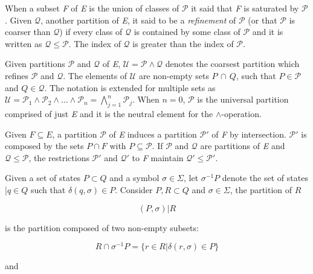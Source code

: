 {When a subset \textit{F} of \textit{E} is the union of classes of $\mathcal{P}$ it said that \textit{F} is saturated by $\mathcal{P}$. Given $\mathcal{Q}$, another partition of \textit{E}, it said to be a \textit{refinement} of $\mathcal{P}$ (or that $\mathcal{P}$ is coarser than $\mathcal{Q}$) if every class of $\mathcal{Q}$ is contained by some class of $\mathcal{P}$ and it is written as $\mathcal{Q} \leq \mathcal{P}$. The index of $\mathcal{Q}$ is greater than the index of $\mathcal{P}$.

Given partitions $\mathcal{P}$ and $\mathcal{Q}$ of \textit{E}, $\mathcal{U} = \mathcal{P}\wedge\mathcal{Q}$ denotes the coarsest partition which refines $\mathcal{P}$ and $\mathcal{Q}$. The elements of $\mathcal{U}$ are non-empty sets $P\,\cap\,Q$, such that $P \in\mathcal{P}$ and 	$Q \in\mathcal{Q}$. The notation is extended for multiple sets as $\mathcal{U} = \mathcal{P}_1 \wedge \mathcal{P}_2 \wedge \ldots \wedge \mathcal{P}_n = \bigwedge\limits_{j=1}^n\mathcal{P}_j$. When $n=0$,  $\mathcal{P}$ is the universal partition comprised of just \textit{E} and it is the neutral element for the $\wedge$-operation.

Given $F\subseteq E$, a partition $\mathcal{P}$ of \textit{E} induces a partition $\mathcal{P}'$  
of \textit{F} by intersection. $\mathcal{P}'$ is composed by the sets $P\cap F$ with $P\subseteq \mathcal{P}$. If $\mathcal{P}$ and $\mathcal{Q}$ are partitions of \textit{E} and $\mathcal{Q} \leq \mathcal{P}$, the restrictions $\mathcal{P}'$ and $\mathcal{Q}'$ to \textit{F} maintain $\mathcal{Q}' \leq \mathcal{P}'$.



Given a set of states $P \subset Q$ and a symbol $\sigma \in \Sigma$, let $\sigma^{-1}\textit{P}$ denote the set of states |$q\in Q$ such that $\delta(q, \sigma) \in P$. Consider $P, R\subset Q$ and $\sigma \in \Sigma$, the partition of $R$

\[
(P, \sigma)|R
\]

\noindent is the partition composed of two non-empty subsets:

\[
R\cap\sigma^{-1}P = \{r \in R | \delta(r,\sigma) \in P\}
\]

\noindent and

}
